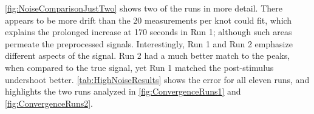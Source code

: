 \autoref{fig:NoiseComparisonJustTwo} shows two of the runs in more detail.
There appears
to be more drift than the 20 measurements per knot could fit, which explains 
the prolonged increase at 170 seconds in Run 1; although such areas
permeate the preprocessed signals.
Interestingly, Run 1 and Run 2 emphasize
different aspects of the signal. Run 2 had a much better match to the 
peaks, when compared to the true signal, yet Run 1 matched the post-stimulus
undershoot better.  \autoref{tab:HighNoiseResults} shows
the error  for all eleven runs, and highlights the two runs analyzed 
in \autoref{fig:ConvergenceRuns1} and \autoref{fig:ConvergenceRuns2}.

\begin{figure}[H]
\\
\end{figure}

\begin{figure}[H]
\\
\end{figure}

